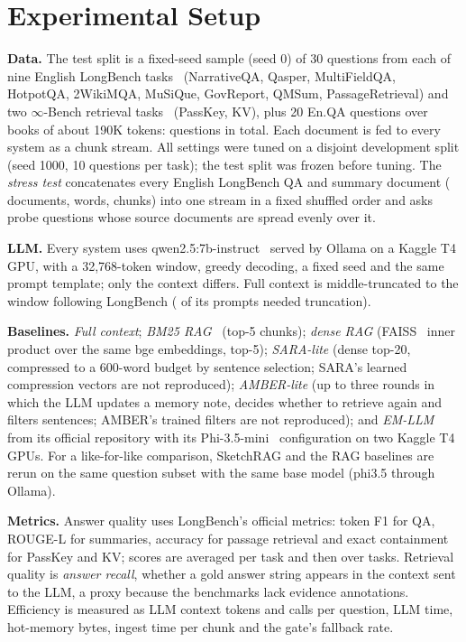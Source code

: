 \documentclass[conference,10pt]{IEEEtran}
\begin{document}
\section{Experimental Setup}
\textbf{Data.} The test split is a fixed-seed sample (seed 0) of 30 questions from each of nine English LongBench
tasks~\cite{bai2024longbench} (NarrativeQA, Qasper, MultiFieldQA, HotpotQA, 2WikiMQA, MuSiQue, GovReport, QMSum,
PassageRetrieval) and two $\infty$-Bench retrieval tasks~\cite{zhang2024infinitebench} (PassKey, KV), plus 20 En.QA
questions over books of about 190K tokens: \NQ{} questions in total. Each document is fed to every system as a chunk
stream. All settings were tuned on a disjoint development split (seed 1000, 10 questions per task); the test split was
frozen before tuning. The \emph{stress test} concatenates every English LongBench QA and summary document (\StressDocs{}
documents, \StressWords{} words, \StressChunks{} chunks) into one stream in a fixed shuffled order and asks
\StressProbes{} probe questions whose source documents are spread evenly over it.

\textbf{LLM.} Every system uses qwen2.5:7b-instruct~\cite{qwen2025qwen25} served by Ollama on a Kaggle T4 GPU, with a
32,768-token window, greedy decoding, a fixed seed and the same prompt template; only the context differs. Full context
is middle-truncated to the window following LongBench (\TruncatedFull{} of its \NQ{} prompts needed truncation).

\textbf{Baselines.} \emph{Full context}; \emph{BM25 RAG}~\cite{robertson2009bm25} (top-5 chunks); \emph{dense RAG}
(FAISS~\cite{johnson2021faiss} inner product over the same bge embeddings, top-5); \emph{SARA-lite} (dense top-20,
compressed to a 600-word budget by sentence selection; SARA's learned compression vectors are not reproduced);
\emph{AMBER-lite} (up to three rounds in which the LLM updates a memory note, decides whether to retrieve again and
filters sentences; AMBER's trained filters are not reproduced); and \emph{EM-LLM} from its official repository with
its Phi-3.5-mini~\cite{abdin2024phi3} configuration on two Kaggle T4 GPUs. For a like-for-like comparison, SketchRAG and
the RAG baselines are rerun on the same question subset with the same base model (phi3.5 through Ollama).

\textbf{Metrics.} Answer quality uses LongBench's official metrics: token F1 for QA, ROUGE-L for summaries, accuracy for
passage retrieval and exact containment for PassKey and KV; scores are averaged per task and then over tasks.
Retrieval quality is \emph{answer recall}, whether a gold answer string appears in the context sent to the LLM, a
proxy because the benchmarks lack evidence annotations. Efficiency is measured as LLM context tokens and calls per
question, LLM time, hot-memory bytes, ingest time per chunk and the gate's fallback rate.
\end{document}
